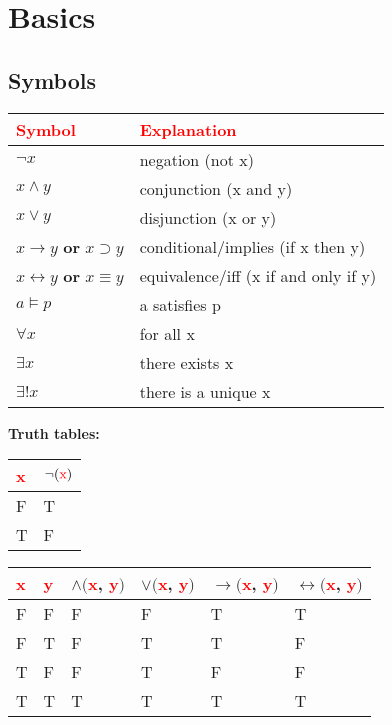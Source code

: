 \section{Basics}

\subsection{Symbols}
\begin{tabular}{|l|l|}
\hline
\textbf{\textcolor{red}{Symbol}} & \textbf{\textcolor{red}{Explanation}} \\
\hline
$\neg x$ & negation (not x) \\
\hline
$x \wedge y$ & conjunction (x and y) \\
\hline
$x \vee y$ & disjunction (x or y) \\
\hline
$x \rightarrow y$ \textbf{or} $x \supset y$ & conditional/implies (if x then y) \\
\hline
$x \leftrightarrow y$ \textbf{or} $x \equiv y$ & equivalence/iff (x if and only if y) \\
\hline
$a \models p$ & a satisfies p \\
\hline 
$\forall x$ & for all x \\
\hline
$\exists x$ & there exists x \\
\hline
$\exists !x$ & there is a unique x \\
\hline
\end{tabular}

\vspace{1cm}

\textbf{Truth tables:}
\begin{table}[!htb]
    \begin{minipage}{.1\linewidth}
      \centering
        \begin{tabular}{|l|l|}
            \hline
            \textcolor{red}{x} & $\neg(\text{\textcolor{red}{x}})$ \\
            \hline 
            F & T \\
            \hline
            T & F \\
            \hline
        \end{tabular}
    \end{minipage}%
    \begin{minipage}{.9\linewidth}
      \centering
        \begin{tabular}{| l | l | l | l | l | l |}
            \hline
            \textcolor{red}{x} & \textcolor{red}{y} & $\wedge($\textcolor{red}{x}, \textcolor{red}{y}$)$ & $\vee($\textcolor{red}{x}, \textcolor{red}{y}$)$ & $\rightarrow($\textcolor{red}{x}, \textcolor{red}{y}$)$ & $\leftrightarrow($\textcolor{red}{x}, \textcolor{red}{y}$)$ \\
            \hline
            F & F & F & F & T & T \\
            F & T & F & T & T & F \\
            T & F & F & T & F & F \\
            T & T & T & T & T & T \\
            \hline
        \end{tabular}
    \end{minipage} 
\end{table}

